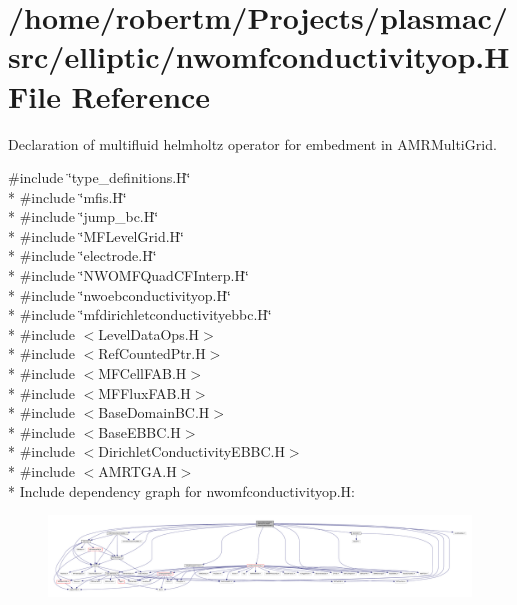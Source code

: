 \hypertarget{nwomfconductivityop_8H}{}\section{/home/robertm/\+Projects/plasmac/src/elliptic/nwomfconductivityop.H File Reference}
\label{nwomfconductivityop_8H}


Declaration of multifluid helmholtz operator for embedment in A\+M\+R\+Multi\+Grid.  


{\ttfamily \#include \char`\"{}type\+\_\+definitions.\+H\char`\"{}}\\*
{\ttfamily \#include \char`\"{}mfis.\+H\char`\"{}}\\*
{\ttfamily \#include \char`\"{}jump\+\_\+bc.\+H\char`\"{}}\\*
{\ttfamily \#include \char`\"{}M\+F\+Level\+Grid.\+H\char`\"{}}\\*
{\ttfamily \#include \char`\"{}electrode.\+H\char`\"{}}\\*
{\ttfamily \#include \char`\"{}N\+W\+O\+M\+F\+Quad\+C\+F\+Interp.\+H\char`\"{}}\\*
{\ttfamily \#include \char`\"{}nwoebconductivityop.\+H\char`\"{}}\\*
{\ttfamily \#include \char`\"{}mfdirichletconductivityebbc.\+H\char`\"{}}\\*
{\ttfamily \#include $<$Level\+Data\+Ops.\+H$>$}\\*
{\ttfamily \#include $<$Ref\+Counted\+Ptr.\+H$>$}\\*
{\ttfamily \#include $<$M\+F\+Cell\+F\+A\+B.\+H$>$}\\*
{\ttfamily \#include $<$M\+F\+Flux\+F\+A\+B.\+H$>$}\\*
{\ttfamily \#include $<$Base\+Domain\+B\+C.\+H$>$}\\*
{\ttfamily \#include $<$Base\+E\+B\+B\+C.\+H$>$}\\*
{\ttfamily \#include $<$Dirichlet\+Conductivity\+E\+B\+B\+C.\+H$>$}\\*
{\ttfamily \#include $<$A\+M\+R\+T\+G\+A.\+H$>$}\\*
Include dependency graph for nwomfconductivityop.\+H\+:\nopagebreak
\begin{figure}[H]
\begin{center}
\leavevmode
\includegraphics[width=350pt]{nwomfconductivityop_8H__incl}
\end{center}
\end{figure}
